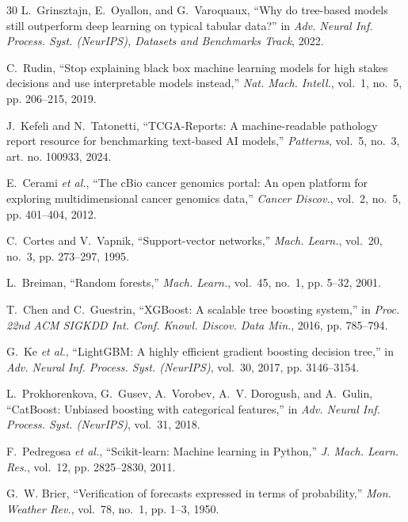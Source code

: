 \begin{thebibliography}{30}
L.~Grinsztajn, E.~Oyallon, and G.~Varoquaux, ``Why do tree-based models still outperform deep learning on typical tabular data?'' in \emph{Adv. Neural Inf. Process. Syst. (NeurIPS), Datasets and Benchmarks Track}, 2022.

C.~Rudin, ``Stop explaining black box machine learning models for high stakes decisions and use interpretable models instead,'' \emph{Nat. Mach. Intell.}, vol.~1, no.~5, pp. 206--215, 2019.

J.~Kefeli and N.~Tatonetti, ``TCGA-Reports: A machine-readable pathology report resource for benchmarking text-based AI models,'' \emph{Patterns}, vol.~5, no.~3, art. no. 100933, 2024.

E.~Cerami \emph{et al.}, ``The cBio cancer genomics portal: An open platform for exploring multidimensional cancer genomics data,'' \emph{Cancer Discov.}, vol.~2, no.~5, pp. 401--404, 2012.

C.~Cortes and V.~Vapnik, ``Support-vector networks,'' \emph{Mach. Learn.}, vol.~20, no.~3, pp. 273--297, 1995.

L.~Breiman, ``Random forests,'' \emph{Mach. Learn.}, vol.~45, no.~1, pp. 5--32, 2001.

T.~Chen and C.~Guestrin, ``XGBoost: A scalable tree boosting system,'' in \emph{Proc. 22nd ACM SIGKDD Int. Conf. Knowl. Discov. Data Min.}, 2016, pp. 785--794.

G.~Ke \emph{et al.}, ``LightGBM: A highly efficient gradient boosting decision tree,'' in \emph{Adv. Neural Inf. Process. Syst. (NeurIPS)}, vol.~30, 2017, pp. 3146--3154.

L.~Prokhorenkova, G.~Gusev, A.~Vorobev, A.~V. Dorogush, and A.~Gulin, ``CatBoost: Unbiased boosting with categorical features,'' in \emph{Adv. Neural Inf. Process. Syst. (NeurIPS)}, vol.~31, 2018.

F.~Pedregosa \emph{et al.}, ``Scikit-learn: Machine learning in Python,'' \emph{J. Mach. Learn. Res.}, vol.~12, pp. 2825--2830, 2011.

G.~W. Brier, ``Verification of forecasts expressed in terms of probability,'' \emph{Mon. Weather Rev.}, vol.~78, no.~1, pp. 1--3, 1950.

\end{thebibliography}
